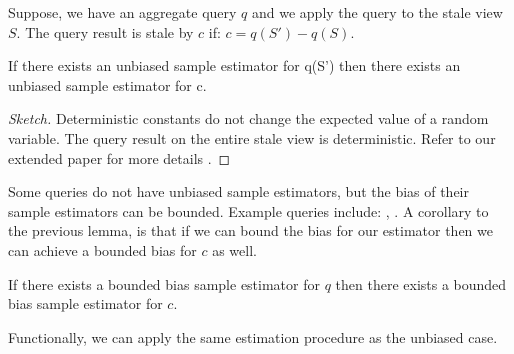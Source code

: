 Suppose, we have an aggregate query $q$ and we apply the query to the stale view $S$.
The query result is stale by $c$ if:
$ c = q(S') - q(S)$.
\begin{lemma}\label{lemma:unbiased}
If there exists an unbiased sample estimator for q(S') then there exists an unbiased sample estimator for c.
\end{lemma}
\begin{proof}[Sketch] 
Deterministic constants do not change the expected value of a random variable.
The query result on the entire stale view is deterministic.
Refer to our extended paper for more details \cite{technicalReport}.
\end{proof}

\iffalse
Suppose, we have an unbiased sample estimator $\bar{q}$ of $q$. 
Then, it follows that \[\mathbb{E}\big[\bar{q}(\hat{S'})\big] = q(S')\]
If we substitute in this expression:
\[ c = \mathbb{E}\big[\bar{q}(\hat{S'})\big] -q(s) \] 
Applying the linearity of expectation:
\[ c = \mathbb{E}\big[\bar{q}(\hat{S'}) - q(s)\big] \]
\fi

Some queries do not have unbiased sample estimators, but the bias of their sample estimators can be bounded. Example queries include: \medfunc, \percfunc.
A corollary to the previous lemma, is that if we can bound the bias for our estimator then we can achieve a bounded bias for $c$ as well.
\begin{corollary}
If there exists a bounded bias sample estimator for $q$ then there exists a bounded bias sample estimator for $c$.
\end{corollary}
Functionally, we can apply the same estimation procedure as the unbiased case.




